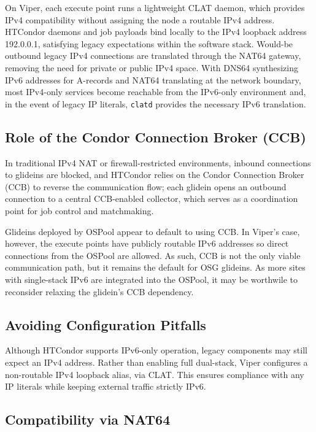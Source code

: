 \documentclass[11pt]{article}
\begin{document}
On Viper, each execute point runs a lightweight CLAT daemon, which provides IPv4 compatibility without assigning the node a routable IPv4 address. HTCondor daemons and job payloads bind locally to the IPv4 loopback address 192.0.0.1, satisfying legacy expectations within the software stack. Would-be outbound legacy IPv4 connections are translated through the NAT64 gateway, removing the need for private or public IPv4 space. With DNS64 synthesizing IPv6 addresses for A-records and NAT64 translating at the network boundary, most IPv4-only services become reachable from the IPv6-only environment and, in the event of legacy IP literals, \texttt{clatd} provides the necessary IPv6 translation. 

\subsection{Role of the Condor Connection Broker (CCB)}

In traditional IPv4 NAT or firewall-restricted environments, inbound connections to glideins are blocked, and HTCondor relies on the Condor Connection Broker (CCB) to reverse the communication flow; each glidein opens an outbound connection to a central CCB-enabled collector, which serves as a coordination point for job control and matchmaking.

Glideins deployed by OSPool appear to default to using CCB. In Viper’s case, however, the execute points have publicly routable IPv6 addresses so direct connections from the OSPool are allowed. As such, CCB is not the only viable communication path, but it remains the default for OSG glideins. As more sites with single-stack IPv6 are integrated into the OSPool, it may be worthwile to reconsider relaxing the glidein's CCB dependency.

\subsection{Avoiding Configuration Pitfalls}

Although HTCondor supports IPv6-only operation, legacy components may still expect an IPv4 address. Rather than enabling full dual-stack, Viper configures a non-routable IPv4 loopback alias, via CLAT. This ensures compliance with any IP literals while keeping external traffic strictly IPv6.


\subsection{Compatibility via NAT64}
\end{document}

